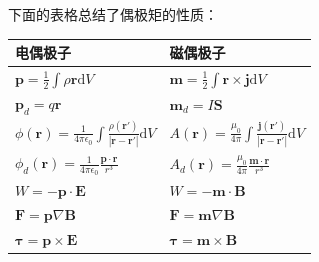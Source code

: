 \documentclass[12pt,onecolumn,a4paper]{book}
\numberwithin{table}{subsection}
\numberwithin{equation}{subsection}
\begin{document}
下面的表格总结了偶极矩的性质：
\begin{table}[ht]
    \centering
    \begin{tabular}{ll}
        \hline
        电偶极子                                                                                                                 & 磁偶极子                                                                                                             \\
        \hline
        $\mathbf{p} = \frac{1}{2}\int \rho \mathbf{r} \mathrm{d} V$                                                          & $\mathbf{m} = \frac{1}{2}\int \mathbf{r} \times \mathbf{j} \mathrm{d} V$                                         \\
        $\mathbf{p}_d = q\mathbf{r}$                                                                                         & $\mathbf{m}_d = I \mathbf{S}$                                                                                    \\
        $\phi(\mathbf{r}) = \frac{1}{4\pi \epsilon_0} \int \frac{\rho (\mathbf{r}')}{|\mathbf{r}-\mathbf{r}'|} \mathrm{d} V$ & $A(\mathbf{r}) = \frac{\mu_0}{4\pi} \int \frac{\mathbf{j} (\mathbf{r}')}{|\mathbf{r}-\mathbf{r}'|} \mathrm{d} V$ \\
        $\phi_d(\mathbf{r}) = \frac{1}{4\pi \epsilon_0} \frac{\mathbf{p} \cdot \mathbf{r}}{r^3}$                             & $A_d(\mathbf{r}) = \frac{\mu_0}{4\pi} \frac{\mathbf{m} \cdot \mathbf{r}}{r^3}$                                   \\
        $W= -\mathbf{p} \cdot \mathbf{E}$                                                                                    & $W= -\mathbf{m} \cdot \mathbf{B}$                                                                                \\
        $\mathbf{F} = \mathbf{p}\nabla  \mathbf{B}$                                                                          & $\mathbf{F} = \mathbf{m}\nabla \mathbf{B}$                                                                       \\
        $\mathbf{\tau} = \mathbf{p} \times \mathbf{E}$                                                                       & $\mathbf{\tau} = \mathbf{m} \times \mathbf{B}$                                                                   \\
        \hline
    \end{tabular}
\end{table}
\end{document}
